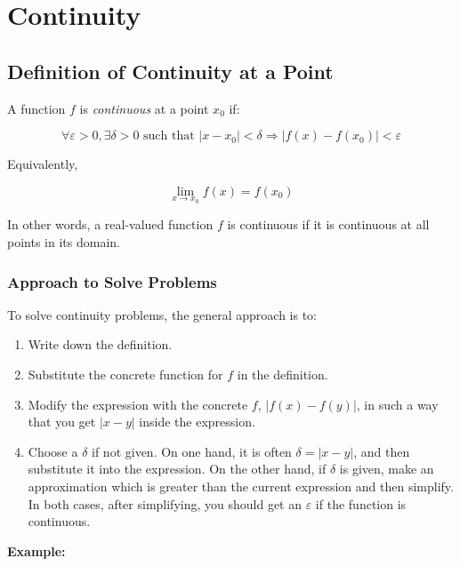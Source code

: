 \chapter{Continuity}

\section{Definition of Continuity at a Point}

A function \(f\) is \emph{continuous} at a point \(x_0\) if:

\[
    \forall \varepsilon > 0, \exists \delta > 0 \text{ such that } |x - x_0| < \delta \Rightarrow |f(x) - f(x_0)| < \varepsilon
\]

Equivalently,

\[
    \lim_{x \to x_0} f(x) = f(x_0)
\]


In other words, a real-valued function \(f\) is continuous if it is continuous at all points in its 
domain.

\subsection{Approach to Solve Problems}

To solve continuity problems, the general approach is to:

\begin{enumerate}

    \item Write down the definition.

    \item Substitute the concrete function for \(f\) in the definition.

    \item Modify the expression with the concrete \(f\), \(|f(x) - f(y)|\), in such a way that you get 
          \(|x - y|\) inside the expression.
    
    \item Choose a \(\delta\) if not given. On one hand, it is often \(\delta = |x - y|\), and then 
          substitute it into the expression. On the other hand, if \(\delta\) is given, make an approximation 
          which is greater than the current expression and then simplify. In both cases, after simplifying, 
          you should get an \(\varepsilon\) if the function is continuous. 

\end{enumerate}

\textbf{Example:} 

